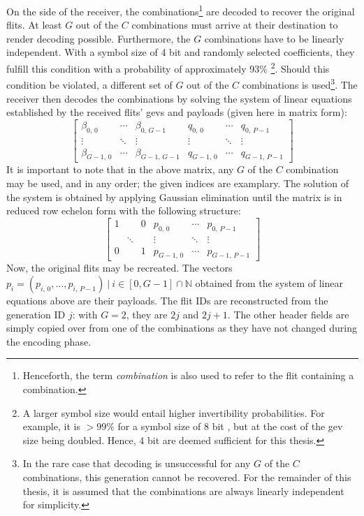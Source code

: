 On the side of the receiver, the combinations\footnote{Henceforth, the term \textit{combination} is also used to refer to the flit containing a
combination.} are decoded to recover the original flits. At least $G$ out of the $C$ combinations must arrive at their
destination to render decoding possible. Furthermore, the $G$ combinations have to be linearly independent. With a symbol size of 4 bit and randomly
selected coefficients, they fulfill this condition with a probability of approximately 93\% \cite[4]{franz18authdraft}\footnote{A larger symbol size would
entail higher invertibility probabilities. For example, it is $>99\%$ for a symbol size of 8 bit \cite[4]{franz18authdraft}, but at the cost of the
\gls{gev} size being doubled. Hence, 4 bit are deemed sufficient for this thesis.}. Should this condition be violated, a different set of $G$ out of
the $C$ combinations is used\footnote{In the rare case that decoding is unsuccessful for any $G$ of the $C$ combinations, this generation cannot be
recovered. For the remainder of this thesis, it is assumed that the combinations are always linearly independent for simplicity.}. The receiver then
decodes the combinations by solving the system of linear equations established by the received flits' \glspl{gev} and payloads (given here in matrix
form):
\[
    \begin{bmatrix}
        \beta_{0,\,0} & \cdots & \beta_{0,\,G-1} & q_{0,\,0} & \cdots & q_{0,\,P-1} \\
        \vdots & \ddots & \vdots & \vdots & \ddots & \vdots \\
        \beta_{G-1,\,0} & \cdots & \beta_{G-1,\,G-1} & q_{G-1,\,0} & \cdots & q_{G-1,\,P-1}
    \end{bmatrix}
\]
It is important to note that in the above matrix, any $G$ of the $C$ combination may be used, and in any order; the given indices are examplary. The
solution of the system is obtained by applying Gaussian elimination until the matrix is in reduced row echelon form with the following structure:
\[
    \begin{bmatrix}
        1 & & 0 & p_{0,\,0} & \cdots & p_{0,\,P-1} \\
        & \ddots & & \vdots & \ddots & \vdots \\
        0 & & 1 & p_{G-1,\,0} & \cdots & p_{G-1,\,P-1}
    \end{bmatrix}
\]
Now, the original flits may be recreated. The vectors $p_i = (p_{i,\,0}, …, p_{i,\,P-1})\ |\ i \in [0, G-1] \cap \mathbb{N}$ obtained from the system of linear
equations above are their payloads. The flit IDs are reconstructed from the generation ID $j$: with $G = 2$, they are $2j$ and $2j+1$. The other
header fields are simply copied over from one of the combinations as they have not changed during the encoding phase.


